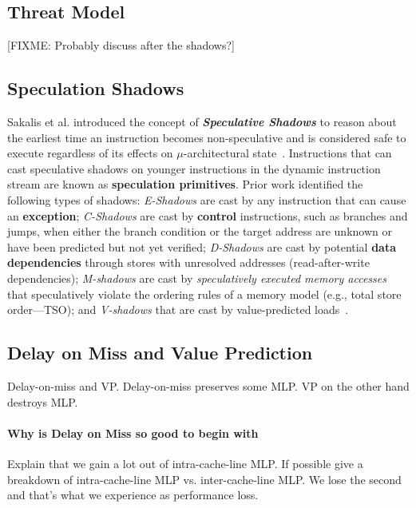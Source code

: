 \subsection{Threat Model}
\label{sec:threat}
{ \color{red} [FIXME: Probably discuss after the shadows?] }

\subsection{Speculation Shadows} 
Sakalis et al. introduced the concept of \textbf{\emph{Speculative Shadows}} to reason about the earliest time an instruction becomes non-speculative and is considered safe to execute regardless of its effects on $\mu$-architectural state~\cite{sakalis+:ISCA2019vp}.
Instructions that can cast speculative shadows on younger instructions in the dynamic instruction stream are known as \textbf{speculation primitives}.
Prior work identified the following types of shadows: \emph{E-Shadows} are cast by any instruction that can cause an \textbf{exception}; 
\emph{C-Shadows} are cast by \textbf{control} instructions, such as branches and jumps, when either the branch condition or the target address are unknown or have been predicted but not yet verified; \emph{D-Shadows} are cast by potential \textbf{data dependencies} through stores with unresolved addresses (read-after-write dependencies); \emph{M-shadows} are cast by \emph{speculatively executed memory accesses} that speculatively violate the ordering rules of a memory model (e.g., total store order---TSO); and \emph{V-shadows} that are cast by value-predicted loads~\cite{sakalis+:ISCA2019vp}.

\subsection{Delay on Miss and Value Prediction}
\label{sec:dom-vp}
Delay-on-miss and VP. Delay-on-miss preserves some MLP. VP on the other hand destroys MLP.

\paragraph{Why is Delay on Miss so good to begin with}
Explain that we gain a lot out of intra-cache-line MLP.
If possible give a breakdown of intra-cache-line MLP vs. inter-cache-line MLP.
We lose the second and that's what we experience as performance loss.

